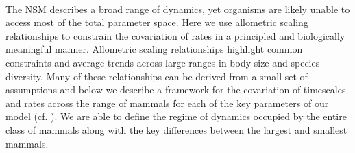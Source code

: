 \documentclass{pnastwo}
\begin{document}
\begin{article}
%



\vspace{2mm}
 \\ 
The NSM describes a broad range of dynamics, yet organisms are likely unable to access most of the total parameter space. Here we use allometric scaling relationships to constrain the covariation of rates in a principled and biologically meaningful manner. %
Allometric scaling relationships highlight common constraints and average trends across large ranges in body size and species diversity. Many of these relationships can be derived from a small set of assumptions and below we describe a framework for the covariation of timescales and rates across the range of mammals for each of the key parameters of our model (cf. \cite{Yodzis:1992hg}). We are able to define the regime of dynamics occupied by the entire class of mammals along with the key differences between the largest and smallest mammals.


\end{article}
\end{document}
